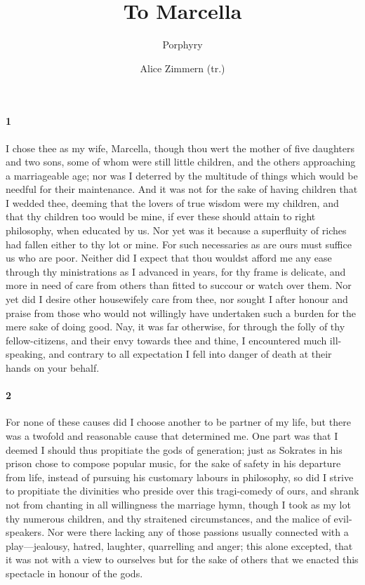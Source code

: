 \documentclass{article}
\title{To Marcella}
\author{Porphyry \and Alice Zimmern (tr.)}
\date{}
\begin{document}
\maketitle

\paragraph{1} I chose thee as my wife, Marcella, though thou wert the mother of five daughters and two sons, some of whom were still little children, and the others approaching a marriageable age; nor was I deterred by the multitude of things which would be needful for their maintenance. And it was not for the sake of having children that I wedded thee, deeming that the lovers of true wisdom were my children, and that thy children too would be mine, if ever these should attain to right philosophy, when educated by us. Nor yet was it because a superfluity of riches had fallen either to thy lot or mine. For such necessaries as are ours must suffice us who are poor. Neither did I expect that thou wouldst afford me any ease through thy ministrations as I advanced in years, for thy frame is delicate, and more in need of care from others than fitted to succour or watch over them. Nor yet did I desire other housewifely care from thee, nor sought I after honour and praise from those who would not willingly have undertaken such a burden for the mere sake of doing good. Nay, it was far otherwise, for through the folly of thy fellow-citizens, and their envy towards thee and thine, I encountered much ill-speaking, and contrary to all expectation I fell into danger of death at their hands on your behalf.

\paragraph{2} For none of these causes did I choose another to be partner of my life, but there was a twofold and reasonable cause that determined me. One part was that I deemed I should thus propitiate the gods of generation; just as Sokrates in his prison chose to compose popular music, for the sake of safety in his departure from life, instead of pursuing his customary labours in philosophy, so did I strive to propitiate the divinities who preside over this tragi-comedy of ours, and shrank not from chanting in all willingness the marriage hymn, though I took as my lot thy numerous children, and thy straitened circumstances, and the malice of evil-speakers. Nor were there lacking any of those passions usually connected with a play---jealousy, hatred, laughter, quarrelling and anger; this alone excepted, that it was not with a view to ourselves but for the sake of others that we enacted this spectacle in honour of the gods.
\end{document}
